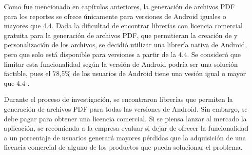 Como fue mencionado en capítulos anteriores, la generación de archivos PDF para los reportes se ofrece únicamente para versiones de Android iguales o mayores que 4.4. Dada la dificultad de encontrar librerías con licencia comercial gratuita para la generación de archivos PDF, que permitieran la creación de y personalización de los archivos, se decidió utilizar una librería nativa de Android, pero que solo está disponible para versiones a partir de la 4.4. Se consideró que limitar esta funcionalidad según la versión de Android podría ser una solución factible, pues el 78,5\% de los usuarios de Android tiene una vesión igual o mayor que 4.4 \cite{USG1}.

Durante el proceso de investigación, se encontraron librerías que permiten la generación de archivos PDF para todas las versiones de Android. Sin embargo, se debe pagar para obtener una licencia comercial. Si se piensa lanzar al mercado la aplicación, se recomienda a la empresa evaluar si dejar de ofrecer la funcionalidad a un porcentaje de usuarios generará mayores pérdidas que la adquisición de una licencia comercial de alguno de los productos que pueda solucionar el problema.


